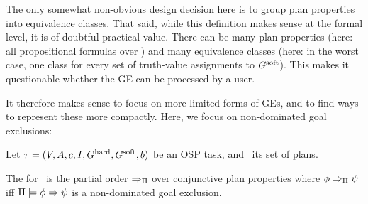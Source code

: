The only somewhat non-obvious design decision here is to group plan
properties into equivalence classes. That said, while this definition
makes sense at the formal level, it is of doubtful practical
value. There can be many plan properties (here: all propositional
formulas over \goalsoft) and many equivalence classes (here: in the
worst case, one class for every set of truth-value assignments to
$G^{\text{\textup{soft}}}$). This makes it questionable whether the GE can be
processed by a user.
%
%

It therefore makes sense to focus on more limited forms of GEs, and to
find ways to represent these more compactly. Here, we focus on
non-dominated goal exclusions:

\begin{definition}
Let $\tau =
(V,\allowbreak A,\allowbreak{\ensuremath{c}},\allowbreak I,\allowbreak G^{\text{\textup{hard}}},\allowbreak G^{\text{\textup{soft}}},\allowbreak{\ensuremath{b}})$
be an OSP task, and \plans\ its set of plans.

The  for \task\ is the partial order
$\Rightarrow_{\Pi}$ over conjunctive plan properties where $\phi
\Rightarrow_{\Pi} \psi$ iff $\Pi \models \phi \Rightarrow \psi$ is a
non-dominated goal exclusion.
%
\end{definition}

